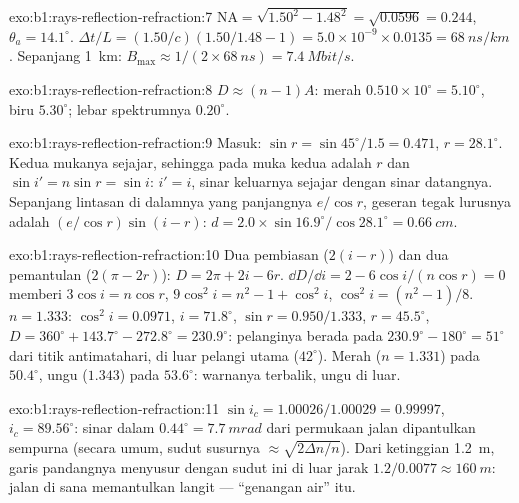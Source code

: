 \begin{solution}{exo:b1:rays-reflection-refraction:7}
$\mathrm{NA} = \sqrt{1.50^2 - 1.48^2} = \sqrt{0.0596} = 0.244$,
$\theta_a = 14.1^\circ$. $\Delta t/L = (1.50/c)(1.50/1.48 - 1) =
5.0\times10^{-9} \times 0.0135 = \qty{68}{ns/km}$. Sepanjang \qty{1}{km}:
$B_{\max} \approx 1/(2 \times \qty{68}{ns}) = \qty{7.4}{Mbit/s}$.
\end{solution}

\begin{solution}{exo:b1:rays-reflection-refraction:8}
$D \approx (n - 1)A$: merah $0.510 \times 10^\circ = 5.10^\circ$, biru
$5.30^\circ$; lebar spektrumnya $0.20^\circ$.
\end{solution}

\begin{solution}{exo:b1:rays-reflection-refraction:9}
Masuk: $\sin r = \sin 45^\circ/1.5 = 0.471$, $r = 28.1^\circ$. Kedua
mukanya sejajar, sehingga  pada muka kedua adalah $r$ dan
$\sin i' = n\sin r = \sin i$: $i' = i$, sinar keluarnya sejajar dengan
sinar datangnya. Sepanjang lintasan di dalamnya yang panjangnya
$e/\cos r$, geseran tegak lurusnya adalah $(e/\cos r)\sin(i - r)$:
$d = 2.0 \times \sin 16.9^\circ/\cos 28.1^\circ = \qty{0.66}{cm}$.
\end{solution}

\begin{solution}{exo:b1:rays-reflection-refraction:10}
Dua pembiasan ($2(i - r)$) dan dua pemantulan ($2(\pi - 2r)$):
$D = 2\pi + 2i - 6r$. $\dd D/\dd i = 2 - 6\cos i/(n\cos r) = 0$ memberi
$3\cos i = n\cos r$, $9\cos^2 i = n^2 - 1 + \cos^2 i$, $\cos^2 i =
(n^2 - 1)/8$. $n = 1.333$: $\cos^2 i = 0.0971$, $i = 71.8^\circ$,
$\sin r = 0.950/1.333$, $r = 45.5^\circ$, $D = 360^\circ + 143.7^\circ -
272.8^\circ = 230.9^\circ$: pelanginya berada pada $230.9^\circ - 180^\circ =
51^\circ$ dari titik antimatahari, di luar pelangi utama ($42^\circ$).
Merah ($n = 1.331$) pada $50.4^\circ$, ungu ($1.343$) pada $53.6^\circ$:
warnanya terbalik, ungu di luar.
\end{solution}

\begin{solution}{exo:b1:rays-reflection-refraction:11}
$\sin i_c = 1.00026/1.00029 = 0.99997$, $i_c = 89.56^\circ$: sinar
dalam $0.44^\circ = \qty{7.7}{mrad}$ dari permukaan jalan dipantulkan
sempurna (secara umum, sudut susurnya $\approx \sqrt{2\Delta n/n}$). Dari
ketinggian \qty{1.2}{m}, garis pandangnya menyusur dengan sudut ini di
luar jarak $1.2/0.0077 \approx \qty{160}{m}$: jalan di sana memantulkan
langit --- ``genangan air'' itu.
\end{solution}


